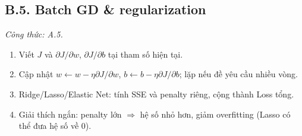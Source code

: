 \subsection*{B.5. Batch GD \& regularization}
\textit{Công thức: A.5.}
\begin{enumerate}
  \item Viết \(J\) và \(\partial J/\partial w\), \(\partial J/\partial b\) tại tham số hiện tại.
  \item Cập nhật \(w\leftarrow w-\eta\partial J/\partial w\), \(b\leftarrow b-\eta\partial J/\partial b\); lặp nếu đề yêu cầu nhiều vòng.
  \item Ridge/Lasso/Elastic Net: tính SSE và penalty riêng, cộng thành Loss tổng.
  \item Giải thích ngắn: penalty lớn \(\Rightarrow\) hệ số nhỏ hơn, giảm overfitting (Lasso có thể đưa hệ số về 0).
\end{enumerate}
